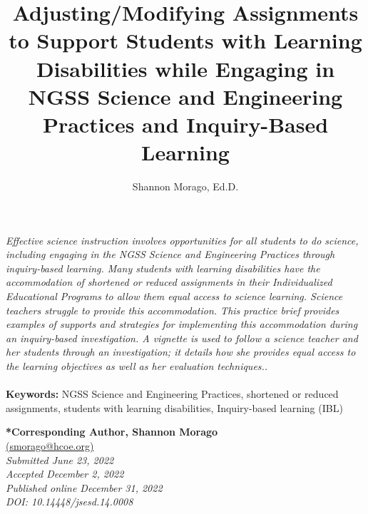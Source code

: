 \documentclass[11pt]{sig-alternate}
\makeatletter
\let\oldabstract\abstract
\let\oldendabstract\endabstract
\renewenvironment{abstract}
{\renewenvironment{quotation}%
               {\list{}{\addtolength{\leftmargin}{1em} %
                        \listparindent 1.5em%
                        \itemindent    \listparindent%
                        \rightmargin   \leftmargin%
                        \parsep        \z@ \@plus\p@}%
                \item\relax}%
               {\endlist}%
\oldabstract}
{\oldendabstract}
\makeatother
\begin{document}
\title{Adjusting/Modifying Assignments to Support Students with Learning Disabilities while Engaging in NGSS Science and Engineering Practices and Inquiry-Based Learning}

\author[1]{\large \color{blue} Shannon Morago, Ed.D.}


\toappear{}

\maketitle
\begin{@twocolumnfalse} 

\begin{abstract}
\begin{large}
\item 
    \textit{Effective science instruction involves opportunities for all students to do science, including engaging in the NGSS Science and Engineering Practices through inquiry-based learning. Many students with learning disabilities have the accommodation of shortened or reduced assignments in their Individualized Educational Programs to allow them equal access to science learning. Science teachers struggle to provide this accommodation. This practice brief provides examples of supports and strategies for implementing this accommodation during an inquiry-based investigation. A vignette is used to follow a science teacher and her students through an investigation; it details how she provides equal access to the learning objectives as well as her evaluation techniques..}
    \\ 
    \\
    \textbf{Keywords:} NGSS Science and Engineering Practices, shortened or reduced assignments, students with learning disabilities, Inquiry-based learning (IBL)
\end{large}
\end{abstract}
\end{@twocolumnfalse}




\textbf{*Corresponding Author, Shannon Morago}\\
\href{mailto:smorago@hcoe.org}{(smorago@hcoe.org)}\\
\textit{Submitted June 23, 2022 }\\
\textit{Accepted December 2, 2022}\\
\textit{Published online December 31, 2022}\\
\textit{DOI: 10.14448/jsesd.14.0008}\\
\end{document}
